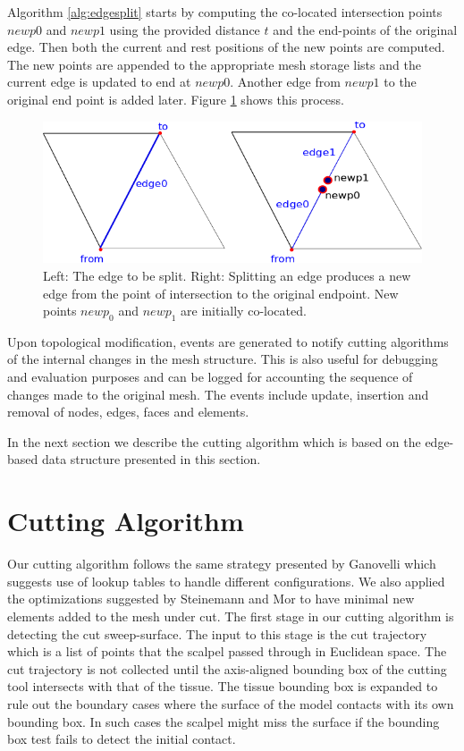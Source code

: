 Algorithm \ref{alg:edgesplit} starts by computing the co-located intersection points $newp0$ and $newp1$ using the provided distance $t$
and the end-points of the original edge. Then both the current and rest positions of the new points are computed. The new points are appended to the 
appropriate mesh storage lists and the current edge is updated to end at $newp0$. Another edge from $newp1$ to the original end point is added later.
Figure \ref{fig:splitedge} shows this process.


\begin{figure}[H]
  \centering
  \includegraphics[width=0.8\linewidth]{figures/cutting/splitedge.png}
  \caption{\label{fig:splitedge}
  {Left: The edge to be split. Right: Splitting an edge produces a new edge from the point of 
  intersection to the original endpoint. New points $newp_0$ and $newp_1$ are initially co-located.}
}
\end{figure}


Upon topological modification, events are generated to notify cutting algorithms of the internal changes in the mesh structure. 
This is also useful for debugging and evaluation purposes and can be logged for accounting the sequence of changes made to the 
original mesh. The events include update, insertion and removal of nodes, edges, faces and elements.


In the next section we describe the cutting algorithm which is based on the edge-based data structure presented in this section.

\section{Cutting Algorithm}
Our cutting algorithm follows the same strategy presented by Ganovelli \etal \cite{Ganovelli2000} which suggests use of lookup tables to 
handle different configurations. We also applied the optimizations suggested by
Steinemann and Mor \etal \cite{Steinemann, Mor2000} to have minimal new elements added to the mesh under cut. 
The first stage in our cutting algorithm is detecting the cut sweep-surface. The input to this stage is the cut trajectory which is a list of points
that the scalpel passed through in Euclidean space. The cut trajectory is not collected until the axis-aligned bounding box of the cutting tool intersects
with that of the tissue. The tissue bounding box is expanded to rule out the boundary cases where the surface of the model contacts with its own bounding 
box. In such cases the scalpel might miss the surface if the bounding box test fails to detect the initial contact. 


